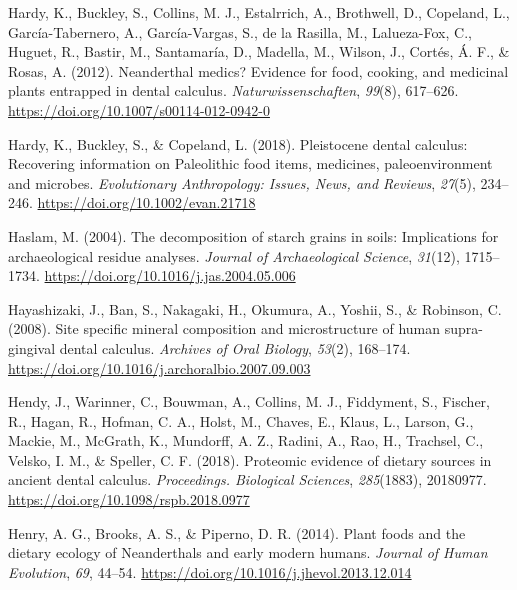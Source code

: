 \documentclass[
  letterpaper,
]{book}
\newlength{\cslhangindent}
\newlength{\cslentryspacingunit} %
\newenvironment{CSLReferences}[2] %
 {%
  \setlength{\parindent}{0pt}
  \ifodd #1
  \let\oldpar\par
  \def\par{\hangindent=\cslhangindent\oldpar}
  \fi
  \setlength{\parskip}{#2\cslentryspacingunit}
 }%
 {}
\begin{document}
\begin{CSLReferences}{1}{0}
\leavevmode{}%
Hardy, K., Buckley, S., Collins, M. J., Estalrrich, A., Brothwell, D.,
Copeland, L., García-Tabernero, A., García-Vargas, S., de la Rasilla,
M., Lalueza-Fox, C., Huguet, R., Bastir, M., Santamaría, D., Madella,
M., Wilson, J., Cortés, Á. F., \& Rosas, A. (2012). Neanderthal medics?
{Evidence} for food, cooking, and medicinal plants entrapped in dental
calculus. \emph{Naturwissenschaften}, \emph{99}(8), 617--626.
\url{https://doi.org/10.1007/s00114-012-0942-0}

\leavevmode{}%
Hardy, K., Buckley, S., \& Copeland, L. (2018). Pleistocene dental
calculus: {Recovering} information on {Paleolithic} food items,
medicines, paleoenvironment and microbes. \emph{Evolutionary
Anthropology: Issues, News, and Reviews}, \emph{27}(5), 234--246.
\url{https://doi.org/10.1002/evan.21718}

\leavevmode{}%
Haslam, M. (2004). The decomposition of starch grains in soils:
Implications for archaeological residue analyses. \emph{Journal of
Archaeological Science}, \emph{31}(12), 1715--1734.
\url{https://doi.org/10.1016/j.jas.2004.05.006}

\leavevmode{}%
Hayashizaki, J., Ban, S., Nakagaki, H., Okumura, A., Yoshii, S., \&
Robinson, C. (2008). Site specific mineral composition and
microstructure of human supra-gingival dental calculus. \emph{Archives
of Oral Biology}, \emph{53}(2), 168--174.
\url{https://doi.org/10.1016/j.archoralbio.2007.09.003}

\leavevmode{}%
Hendy, J., Warinner, C., Bouwman, A., Collins, M. J., Fiddyment, S.,
Fischer, R., Hagan, R., Hofman, C. A., Holst, M., Chaves, E., Klaus, L.,
Larson, G., Mackie, M., McGrath, K., Mundorff, A. Z., Radini, A., Rao,
H., Trachsel, C., Velsko, I. M., \& Speller, C. F. (2018). Proteomic
evidence of dietary sources in ancient dental calculus.
\emph{Proceedings. Biological Sciences}, \emph{285}(1883), 20180977.
\url{https://doi.org/10.1098/rspb.2018.0977}

\leavevmode{}%
Henry, A. G., Brooks, A. S., \& Piperno, D. R. (2014). Plant foods and
the dietary ecology of {Neanderthals} and early modern humans.
\emph{Journal of Human Evolution}, \emph{69}, 44--54.
\url{https://doi.org/10.1016/j.jhevol.2013.12.014}


\end{CSLReferences}
\end{document}
